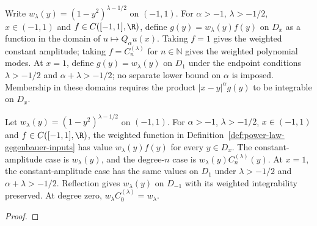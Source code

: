 \begin{supporting}
\begin{definition}
\label{def:power-law-gegenbauer-inputs}
\leanok
Write $w_\lambda(y)=(1-y^2)^{\lambda-1/2}$ on $(-1,1)$.
For $\alpha>-1$, $\lambda>-1/2$, $x\in(-1,1)$ and
$f\in C([-1,1],\R)$, define $g(y)=w_\lambda(y)f(y)$ on $D_x$
as a function in the domain of $u\mapsto Q_\alpha u(x)$.
Taking $f=1$ gives the weighted constant amplitude; taking
$f=C_n^{(\lambda)}$ for $n\in\mathbb N$ gives the weighted polynomial modes.
At $x=1$, define $g(y)=w_\lambda(y)$ on $D_1$ under the endpoint conditions
$\lambda>-1/2$ and $\alpha+\lambda>-1/2$; no separate lower bound on $\alpha$
is imposed. Membership in these domains requires the product
$|x-y|^\alpha g(y)$ to be integrable on $D_x$.
\end{definition}
\begin{theorem}
\label{thm:power-law-gegenbauer-inputs}
\leanok
Let $w_\lambda(y)=(1-y^2)^{\lambda-1/2}$ on $(-1,1)$.
For $\alpha>-1$, $\lambda>-1/2$, $x\in(-1,1)$ and
$f\in C([-1,1],\R)$, the weighted function in
Definition~\ref{def:power-law-gegenbauer-inputs} has value $w_\lambda(y)f(y)$
for every $y\in D_x$. The constant-amplitude case is $w_\lambda(y)$,
and the degree-$n$ case is $w_\lambda(y)C_n^{(\lambda)}(y)$.
At $x=1$, the constant-amplitude case has the same values on $D_1$ under
$\lambda>-1/2$ and $\alpha+\lambda>-1/2$.
Reflection gives $w_\lambda(y)$ on $D_{-1}$ with its weighted integrability
preserved. At degree zero, $w_\lambda C_0^{(\lambda)}=w_\lambda$.
\end{theorem}
\begin{proof}
\leanok
\end{proof}


\end{supporting}
